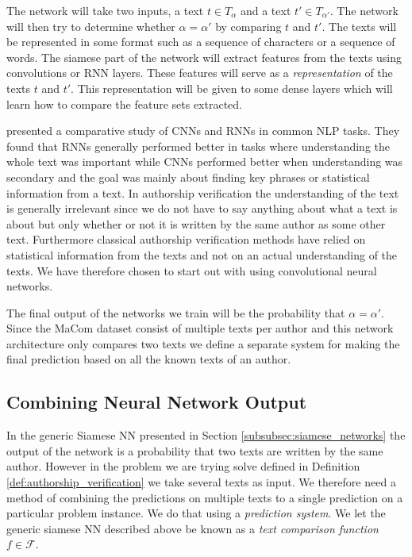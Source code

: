 The network will take two inputs, a text $t \in T_\alpha$ and a text $t' \in
T_{\alpha'}$. The network will then try to determine whether $\alpha = \alpha'$
by comparing $t$ and $t'$. The texts will be represented in some format such as
a sequence of characters or a sequence of words. The siamese part of the network
will extract features from the texts using convolutions or \gls{RNN} layers.
These features will serve as a \textit{representation} of the texts $t$ and
$t'$. This representation will be given to some dense layers which will learn
how to compare the feature sets extracted.

\citet{DBLP:journals/corr/0001KYS17} presented a comparative study of
\glspl{CNN} and \glspl{RNN} in common \gls{NLP} tasks. They found that
\glspl{RNN} generally performed better in tasks where understanding the whole
text was important while \glspl{CNN} performed better when understanding was
secondary and the goal was mainly about finding key phrases or statistical
information from a text. In authorship verification the understanding of the
text is generally irrelevant since we do not have to say anything about what a
text is about but only whether or not it is written by the same author as some
other text. Furthermore classical authorship verification methods have relied
on statistical information from the texts and not on an actual understanding of
the texts. We have therefore chosen to start out with using convolutional neural
networks.

The final output of the networks we train will be the probability that $\alpha =
\alpha'$. Since the MaCom dataset consist of multiple texts per author and this
network architecture only compares two texts we define a separate system for
making the final prediction based on all the known texts of an author.


\subsection{Combining Neural Network Output}
\label{subsec:combining_neural_network_output}

In the generic Siamese \gls{NN} presented in Section
\ref{subsubsec:siamese_networks} the output of the network is a probability
that two texts are written by the same author. However in the problem we are
trying solve defined in Definition \ref{def:authorship_verification} we take
several texts as input. We therefore need a method of combining the predictions
on multiple texts to a single prediction on a particular problem instance.
We do that using a \textit{prediction system}. We let the generic siamese
\gls{NN} described above be known as a \textit{text comparison function} $f \in
\mathcal{F}$.

